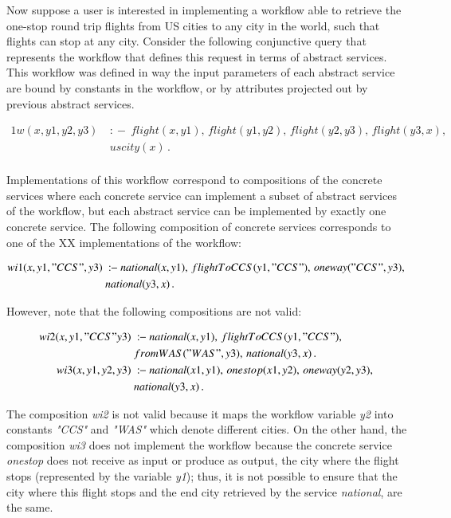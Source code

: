 \documentclass{llncs}
\newcommand{\qrule}{:\!\!-}
\begin{document}
Now suppose a user is interested in implementing a workflow able to retrieve the one-stop round trip flights from US cities to any city in the world, such that flights can stop at any city. 
Consider the following conjunctive query that represents the workflow that defines this request in terms of abstract services. This workflow was defined in way the input parameters of each abstract service are bound by  constants in the workflow, or by attributes projected out by  previous abstract services.

\begin{alignat*}{1}
w(x,y1,y2,y3)\ &\qrule\ flight(x,y1),\, flight(y1,y2),\,  flight(y2,y3),\,  flight(y3,x),\,  \\
                   \ & uscity(x)\,. \\
\end{alignat*}

Implementations of this workflow correspond to compositions of the concrete services where each concrete service can implement a subset of abstract services of the workflow, but each abstract service can be implemented by exactly one concrete service. The following composition of concrete services corresponds to one of the XX implementations of the workflow:

\begin{alignat*}{1}
wi1(x,y1,"CCS",y3)\ &\qrule\ national(x,y1),\, flightToCCS(y1,"CCS"),\,  oneway("CCS",y3),\,  \\
\ & national(y3,x)\,.  \\
\end{alignat*}

However, note that the following compositions are not valid:


\begin{alignat*}{1}
wi2(x,y1,"CCS"y3)\ &\qrule\ national(x,y1),\, flightToCCS(y1,"CCS"),\, \\
\ & fromWAS("WAS",y3),\,  national(y3,x)\,. \\
wi3(x,y1,y2,y3)\ &\qrule\ national(x1,y1),\, onestop(x1,y2),\,  oneway(y2,y3),\,  \\
\ & national(y3,x)\,. \\
\end{alignat*}

The composition {\it wi2} is not valid because  it maps the workflow variable
{\it y2} into constants {\it "CCS"} and {\it "WAS"} which denote different cities.
On the other hand, the composition {\it wi3} does not implement the workflow because the concrete service  {\it onestop} does not receive as input or produce as output, the city where the flight stops (represented by the variable {\it y1}); thus, it is not possible to ensure that the city where this flight stops and the end city  retrieved by the service {\it national}, are the same.
\end{document}
